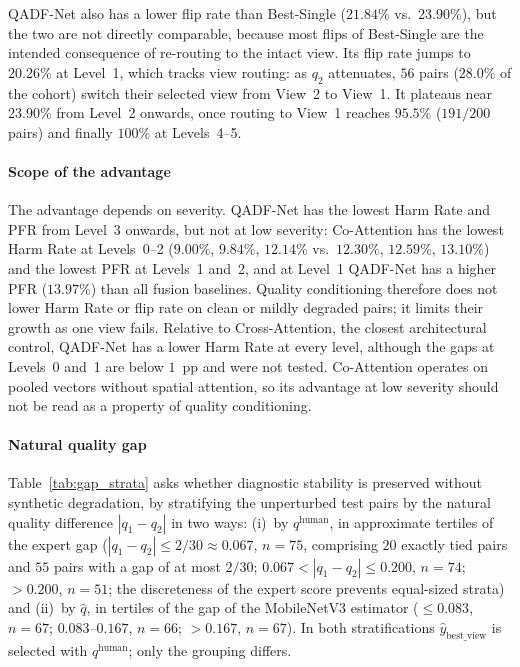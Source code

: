 \documentclass[final,5p,times,twocolumn,authoryear]{elsarticle}
\newcommand{\qadfnet}{QADF-Net}
\theoremstyle{plain}
\theoremstyle{remark}
\begin{document}
\qadfnet{} also has a lower flip rate than Best-Single ($21.84\%$ vs.\ $23.90\%$), but the two are not directly comparable, because most flips of Best-Single are the intended consequence of re-routing to the intact view. Its flip rate jumps to $20.26\%$ at Level~1, which tracks view routing: as $q_2$ attenuates, $56$ pairs ($28.0\%$ of the cohort) switch their selected view from View~2 to View~1. It plateaus near $23.90\%$ from Level~2 onwards, once routing to View~1 reaches $95.5\%$ ($191/200$ pairs) and finally $100\%$ at Levels~4--5.

\paragraph{Scope of the advantage} The advantage depends on severity. \qadfnet{} has the lowest Harm Rate and PFR from Level~3 onwards, but not at low severity: Co-Attention has the lowest Harm Rate at Levels~0--2 ($9.00\%$, $9.84\%$, $12.14\%$ vs.\ $12.30\%$, $12.59\%$, $13.10\%$) and the lowest PFR at Levels~1 and~2, and at Level~1 \qadfnet{} has a higher PFR ($13.97\%$) than all fusion baselines. Quality conditioning therefore does not lower Harm Rate or flip rate on clean or mildly degraded pairs; it limits their growth as one view fails. Relative to Cross-Attention, the closest architectural control, \qadfnet{} has a lower Harm Rate at every level, although the gaps at Levels~0 and~1 are below $1$~pp and were not tested. Co-Attention operates on pooled vectors without spatial attention, so its advantage at low severity should not be read as a property of quality conditioning.

\paragraph{Natural quality gap} Table~\ref{tab:gap_strata} asks whether diagnostic stability is preserved without synthetic degradation, by stratifying the unperturbed test pairs by the natural quality difference $|q_1 - q_2|$ in two ways: (i)~by $q^{\text{human}}$, in approximate tertiles of the expert gap ($|q_1 - q_2| \le 2/30 \approx 0.067$, $n=75$, comprising $20$ exactly tied pairs and $55$ pairs with a gap of at most $2/30$; $0.067 < |q_1 - q_2| \le 0.200$, $n=74$; $>0.200$, $n=51$; the discreteness of the expert score prevents equal-sized strata) and (ii)~by $\hat{q}$, in tertiles of the gap of the MobileNetV3 estimator ($\le 0.083$, $n=67$; $0.083$--$0.167$, $n=66$; $>0.167$, $n=67$). In both stratifications $\hat{y}_{\text{best\_view}}$ is selected with $q^{\text{human}}$; only the grouping differs.
\end{document}
